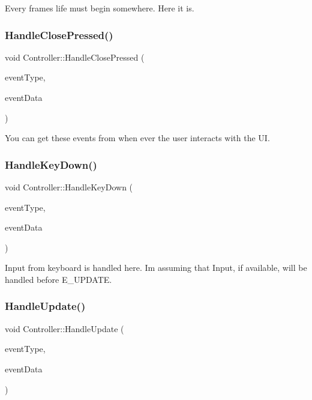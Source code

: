 Every frame\textquotesingle{}s life must begin somewhere. Here it is. \mbox{\label{class_controller_a23b30ec90fc2a9ba09c046723089f1c4}} 
\subsubsection{\texorpdfstring{HandleClosePressed()}{HandleClosePressed()}}
{\footnotesize\ttfamily void Controller\+::\+Handle\+Close\+Pressed (\begin{DoxyParamCaption}\item[{String\+Hash}]{event\+Type,  }\item[{Variant\+Map \&}]{event\+Data }\end{DoxyParamCaption})\hspace{0.3cm}{\ttfamily [inline]}}

You can get these events from when ever the user interacts with the UI. \mbox{\label{class_controller_ab92e60b1b80d19b872182bb82bff4b39}} 
\subsubsection{\texorpdfstring{HandleKeyDown()}{HandleKeyDown()}}
{\footnotesize\ttfamily void Controller\+::\+Handle\+Key\+Down (\begin{DoxyParamCaption}\item[{String\+Hash}]{event\+Type,  }\item[{Variant\+Map \&}]{event\+Data }\end{DoxyParamCaption})\hspace{0.3cm}{\ttfamily [inline]}}

Input from keyboard is handled here. I\textquotesingle{}m assuming that Input, if available, will be handled before E\+\_\+\+U\+P\+D\+A\+TE. \mbox{\label{class_controller_a7133c51cf9ea02a697febada2e545cc9}} 
\subsubsection{\texorpdfstring{HandleUpdate()}{HandleUpdate()}}
{\footnotesize\ttfamily void Controller\+::\+Handle\+Update (\begin{DoxyParamCaption}\item[{String\+Hash}]{event\+Type,  }\item[{Variant\+Map \&}]{event\+Data }\end{DoxyParamCaption})\hspace{0.3cm}{\ttfamily [inline]}}

